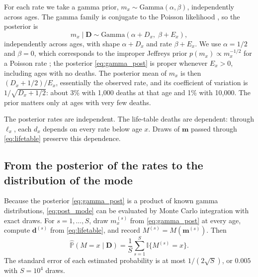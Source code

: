 \documentclass[12pt, letterpaper]{article}
\begin{document}
For each rate we take a gamma prior, $m_x \sim \text{Gamma}(\alpha, \beta)$, independently across ages. The gamma family is conjugate to the Poisson likelihood \citep{gelman1995bayesian}, so the posterior is
\begin{equation}
m_x \mid \bm{D} \sim \text{Gamma}(\alpha + D_x, \; \beta + E_x),
\label{eq:gamma_post}
\end{equation}
independently across ages, with shape $\alpha + D_x$ and rate $\beta + E_x$. We use $\alpha = 1/2$ and $\beta = 0$, which corresponds to the improper Jeffreys prior $p(m_x) \propto m_x^{-1/2}$ for a Poisson rate \citep{gelman1995bayesian}; the posterior \eqref{eq:gamma_post} is proper whenever $E_x > 0$, including ages with no deaths. The posterior mean of $m_x$ is then $(D_x + 1/2)/E_x$, essentially the observed rate, and its coefficient of variation is $1/\sqrt{D_x + 1/2}$: about 3\% with 1{,}000 deaths at that age and 1\% with 10{,}000. The prior matters only at ages with very few deaths.

The posterior rates are independent. The life-table deaths are dependent: through $\ell_x$, each $d_x$ depends on every rate below age $x$. Draws of $\bm{m}$ passed through \eqref{eq:lifetable} preserve this dependence.

\subsection{From the posterior of the rates to the distribution of the mode}
\label{sec:mode_dist}

Because the posterior \eqref{eq:gamma_post} is a product of known gamma distributions, \eqref{eq:post_mode} can be evaluated by Monte Carlo integration with exact draws. For $s = 1, \dots, S$, draw $m_x^{(s)}$ from \eqref{eq:gamma_post} at every age, compute $\bm{d}^{(s)}$ from \eqref{eq:lifetable}, and record $M^{(s)} = M(\bm{m}^{(s)})$. Then
\begin{equation}
\widehat{\mathbb{P}}(M = x \mid \bm{D}) = \frac{1}{S} \sum_{s=1}^{S} \mathbb{I}\{M^{(s)} = x\}.
\label{eq:mc}
\end{equation}
The standard error of each estimated probability is at most $1/(2\sqrt{S})$, or $0.005$ with $S = 10^4$ draws.
\end{document}
